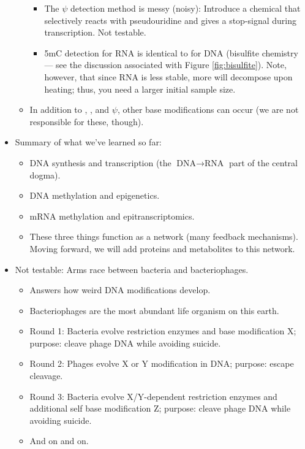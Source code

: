 \documentclass[../notes.tex]{subfiles}
\begin{document}
\begin{itemize}
\begin{itemize}
\begin{itemize}
            \item The $\psi$ detection method is messy (noisy): Introduce a chemical that selectively reacts with pseudouridine and gives a stop-signal during transcription. Not testable.
            \item 5mC detection for RNA is identical to for DNA (bisulfite chemistry --- see the discussion associated with Figure \ref{fig:bisulfite}). Note, however, that since RNA is less stable, more will decompose upon heating; thus, you need a larger initial sample size.
        \end{itemize}
        \item In addition to , , and $\psi$, other base modifications can occur (we are not responsible for these, though).
    \end{itemize}
    \item Summary of what we've learned so far:
    \begin{itemize}
        \item DNA synthesis and transcription (the $\text{DNA}\to\text{RNA}$ part of the central dogma).
        \item DNA methylation and epigenetics.
        \item mRNA methylation and epitranscriptomics.
        \item These three things function as a network (many feedback mechanisms). Moving forward, we will add proteins and metabolites to this network.
    \end{itemize}
    \item Not testable: Arms race between bacteria and bacteriophages.
    \begin{itemize}
        \item Answers how weird DNA modifications develop.
        \item Bacteriophages are the most abundant life organism on this earth.
        \item Round 1: Bacteria evolve restriction enzymes and base modification X; purpose: cleave phage DNA while avoiding suicide.
        \item Round 2: Phages evolve X or Y modification in DNA; purpose: escape cleavage.
        \item Round 3: Bacteria evolve X/Y-dependent restriction enzymes and additional self base modification Z; purpose: cleave phage DNA while avoiding suicide.
        \item And on and on.
    \end{itemize}

\end{itemize}
\end{document}
